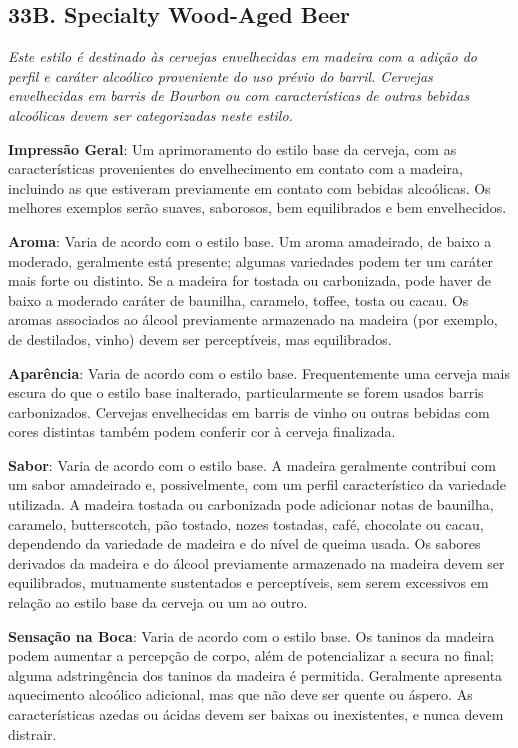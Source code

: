 \subsection*{33B. Specialty Wood-Aged Beer}
\textit{Este estilo é destinado às cervejas envelhecidas em madeira com a adição do perfil e caráter alcoólico proveniente do uso prévio do barril. Cervejas envelhecidas em barris de Bourbon ou com características de outras bebidas alcoólicas devem ser categorizadas neste estilo.}

\textbf{Impressão Geral}: Um aprimoramento do estilo base da cerveja, com as características provenientes do envelhecimento em contato com a madeira, incluindo as que estiveram previamente em contato com bebidas alcoólicas. Os melhores exemplos serão suaves, saborosos, bem equilibrados e bem envelhecidos.

\textbf{Aroma}: Varia de acordo com o estilo base. Um aroma amadeirado, de baixo a moderado, geralmente está presente; algumas variedades podem ter um caráter mais forte ou distinto. Se a madeira for tostada ou carbonizada, pode haver de baixo a moderado caráter de baunilha, caramelo, toffee, tosta ou cacau. Os aromas associados ao álcool previamente armazenado na madeira (por exemplo, de destilados, vinho) devem ser perceptíveis, mas equilibrados.

\textbf{Aparência}: Varia de acordo com o estilo base. Frequentemente uma cerveja mais escura do que o estilo base inalterado, particularmente se forem usados barris carbonizados. Cervejas envelhecidas em barris de vinho ou outras bebidas com cores distintas também podem conferir cor à cerveja finalizada.

\textbf{Sabor}: Varia de acordo com o estilo base. A madeira geralmente contribui com um sabor amadeirado e, possivelmente, com um perfil característico da variedade utilizada. A madeira tostada ou carbonizada pode adicionar notas de baunilha, caramelo, butterscotch, pão tostado, nozes tostadas, café, chocolate ou cacau, dependendo da variedade de madeira e do nível de queima usada. Os sabores derivados da madeira e do álcool previamente armazenado na madeira devem ser equilibrados, mutuamente sustentados e perceptíveis, sem serem excessivos em relação ao estilo base da cerveja ou um ao outro.

\textbf{Sensação na Boca}: Varia de acordo com o estilo base. Os taninos da madeira podem aumentar a percepção de corpo, além de potencializar a secura no final; alguma adstringência dos taninos da madeira é permitida. Geralmente apresenta aquecimento alcoólico adicional, mas que não deve ser quente ou áspero. As características azedas ou ácidas devem ser baixas ou inexistentes, e nunca devem distrair.

